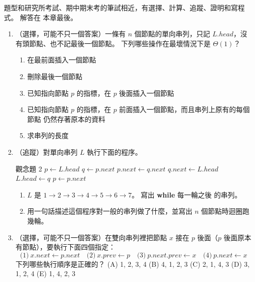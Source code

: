 題型和研究所考試、期中期末考的筆試相近，有選擇、計算、追蹤、證明和寫程式。 解答在
本章最後。

\begin{enumerate}
\item （選擇，可能不只一個答案）一條有 $n$ 個節點的單向串列，只記
$L.\mathit{head}$，沒有頭節點、也不記最後一個節點。 下列哪些操作在最壞情況下是
$\Theta(1)$？
\begin{enumerate}
\item 在最前面插入一個節點
\item 刪除最後一個節點
\item 已知指向節點 $p$ 的指標，在 $p$ 後面插入一個節點
\item 已知指向節點 $p$ 的指標，在 $p$ 前面插入一個節點，而且串列上原有的每個節點
仍然存著原本的資料
\item 求串列的長度
\end{enumerate}

\item （追蹤）對單向串列 $L$ 執行下面的程序。
\begin{pseudo}{觀念題 2}
    \State $p \gets L.\mathit{head}$
        \State $q \gets p.\mathit{next}$
        \State $p.\mathit{next} \gets q.\mathit{next}$
        \State $q.\mathit{next} \gets L.\mathit{head}$
        \State $L.\mathit{head} \gets q$
        \State $p \gets p.\mathit{next}$
    \EndWhile
\EndProcedure
\end{pseudo}
\begin{enumerate}
\item $L$ 是 $1 \to 2 \to 3 \to 4 \to 5 \to 6 \to 7$。 寫出 \textbf{while} 每一輪之後
的串列。
\item 用一句話描述這個程序對一般的串列做了什麼，並寫出 $n$ 個節點時迴圈跑幾輪。
\end{enumerate}

\item （選擇，可能不只一個答案）在雙向串列裡把節點 $x$ 接在 $p$ 後面（$p$ 後面原本
有節點），要執行下面四個指定：
\[
\text{(1)}\ x.\mathit{next} \gets p.\mathit{next} \quad
\text{(2)}\ x.\mathit{prev} \gets p \quad
\text{(3)}\ p.\mathit{next}.\mathit{prev} \gets x \quad
\text{(4)}\ p.\mathit{next} \gets x
\]
下列哪些執行順序是正確的？
(A) 1, 2, 3, 4 \quad (B) 4, 1, 2, 3 \quad (C) 2, 1, 4, 3 \quad (D) 3, 1, 2, 4 \quad
(E) 1, 4, 2, 3


\end{enumerate}
